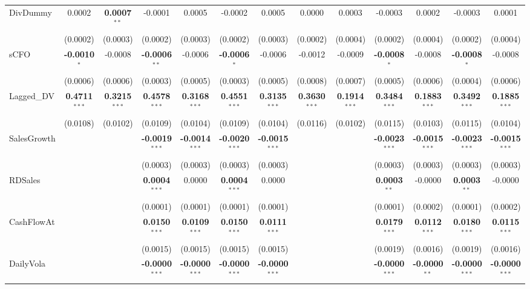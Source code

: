 \begin{landscape}
\begin{table}[H]
\begin{tabular}{lcccccccccccc}
DivDummy & 0.0002 & \textbf{0.0007}$^{**}$ & -0.0001 & 0.0005 & -0.0002 & 0.0005 & 0.0000 & 0.0003 & -0.0003 & 0.0002 & -0.0003 & 0.0001 \\
 & (0.0002) & (0.0003) & (0.0002) & (0.0003) & (0.0002) & (0.0003) & (0.0002) & (0.0004) & (0.0002) & (0.0004) & (0.0002) & (0.0004) \\
sCFO & \textbf{-0.0010}$^{*}$ & -0.0008 & \textbf{-0.0006}$^{**}$ & -0.0006 & \textbf{-0.0006}$^{*}$ & -0.0006 & -0.0012 & -0.0009 & \textbf{-0.0008}$^{*}$ & -0.0008 & \textbf{-0.0008}$^{*}$ & -0.0008 \\
 & (0.0006) & (0.0006) & (0.0003) & (0.0005) & (0.0003) & (0.0005) & (0.0008) & (0.0007) & (0.0005) & (0.0006) & (0.0004) & (0.0006) \\
Lagged\_DV & \textbf{0.4711}$^{***}$ & \textbf{0.3215}$^{***}$ & \textbf{0.4578}$^{***}$ & \textbf{0.3168}$^{***}$ & \textbf{0.4551}$^{***}$ & \textbf{0.3135}$^{***}$ & \textbf{0.3630}$^{***}$ & \textbf{0.1914}$^{***}$ & \textbf{0.3484}$^{***}$ & \textbf{0.1883}$^{***}$ & \textbf{0.3492}$^{***}$ & \textbf{0.1885}$^{***}$ \\
 & (0.0108) & (0.0102) & (0.0109) & (0.0104) & (0.0109) & (0.0104) & (0.0116) & (0.0102) & (0.0115) & (0.0103) & (0.0115) & (0.0104) \\
SalesGrowth &  &  & \textbf{-0.0019}$^{***}$ & \textbf{-0.0014}$^{***}$ & \textbf{-0.0020}$^{***}$ & \textbf{-0.0015}$^{***}$ &  &  & \textbf{-0.0023}$^{***}$ & \textbf{-0.0015}$^{***}$ & \textbf{-0.0023}$^{***}$ & \textbf{-0.0015}$^{***}$ \\
 &  &  & (0.0003) & (0.0003) & (0.0003) & (0.0003) &  &  & (0.0003) & (0.0003) & (0.0003) & (0.0003) \\
RDSales &  &  & \textbf{0.0004}$^{***}$ & 0.0000 & \textbf{0.0004}$^{***}$ & 0.0000 &  &  & \textbf{0.0003}$^{**}$ & -0.0000 & \textbf{0.0003}$^{**}$ & -0.0000 \\
 &  &  & (0.0001) & (0.0001) & (0.0001) & (0.0001) &  &  & (0.0001) & (0.0002) & (0.0001) & (0.0002) \\
CashFlowAt &  &  & \textbf{0.0150}$^{***}$ & \textbf{0.0109}$^{***}$ & \textbf{0.0150}$^{***}$ & \textbf{0.0111}$^{***}$ &  &  & \textbf{0.0179}$^{***}$ & \textbf{0.0112}$^{***}$ & \textbf{0.0180}$^{***}$ & \textbf{0.0115}$^{***}$ \\
 &  &  & (0.0015) & (0.0015) & (0.0015) & (0.0015) &  &  & (0.0019) & (0.0016) & (0.0019) & (0.0016) \\
DailyVola &  &  & \textbf{-0.0000}$^{***}$ & \textbf{-0.0000}$^{***}$ & \textbf{-0.0000}$^{***}$ & \textbf{-0.0000}$^{***}$ &  &  & \textbf{-0.0000}$^{***}$ & \textbf{-0.0000}$^{**}$ & \textbf{-0.0000}$^{***}$ & \textbf{-0.0000}$^{***}$ \\

\end{tabular}
\end{table}
\end{landscape}
